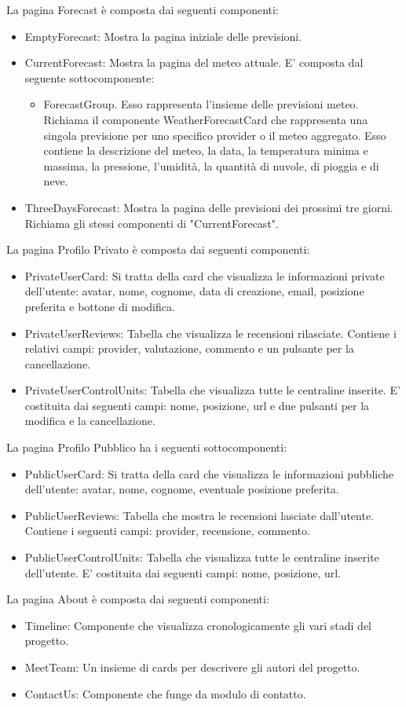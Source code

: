 La pagina Forecast è composta dai seguenti componenti:
\begin{itemize}
    \item EmptyForecast: Mostra la pagina iniziale delle previsioni.
    \item CurrentForecast: Mostra la pagina del meteo attuale. E' composta dal seguente sottocomponente: 
    \begin{itemize}
    \item ForecastGroup. Esso rappresenta l'insieme delle previsioni meteo. Richiama il componente WeatherForecastCard che rappresenta una singola previsione per uno specifico provider o il meteo aggregato. Esso contiene la descrizione del meteo, la data, la temperatura minima e massima, la pressione, l'umidità, la quantità di nuvole, di pioggia e di neve. 
    \end{itemize}
    \item ThreeDaysForecast: Mostra la pagina delle previsioni dei prossimi tre giorni. Richiama gli stessi componenti di "CurrentForecast".
\end{itemize}
La pagina Profilo Privato è composta dai seguenti componenti:
\begin{itemize}
    \item PrivateUserCard: Si tratta della card che visualizza le informazioni private dell'utente: avatar, nome, cognome, data di creazione, email, posizione preferita e bottone di modifica.
    \item PrivateUserReviews: Tabella che visualizza le recensioni rilasciate. Contiene i relativi campi: provider, valutazione, commento e un pulsante per la cancellazione.
    \item PrivateUserControlUnits: Tabella che visualizza tutte le centraline inserite. E' costituita dai seguenti campi: nome, posizione, url e due pulsanti per la modifica e la cancellazione.

\end{itemize}
La pagina Profilo Pubblico ha i seguenti sottocomponenti:
\begin{itemize}
    \item PublicUserCard: Si tratta della card che visualizza le informazioni pubbliche dell'utente: avatar, nome, cognome, eventuale posizione preferita.
    \item PublicUserReviews: Tabella che mostra le recensioni lasciate dall'utente. Contiene i seguenti campi: provider, recensione, commento.
    \item PublicUserControlUnits: Tabella che visualizza tutte le centraline inserite dell'utente. E' costituita dai seguenti campi: nome, posizione, url.

\end{itemize}   
La pagina About è composta dai seguenti componenti:
\begin{itemize}
    \item Timeline: Componente che visualizza cronologicamente gli vari stadi del progetto.
    \item MeetTeam: Un insieme di cards per descrivere gli autori del progetto. 
    \item ContactUs: Componente che funge da modulo di contatto.
\end{itemize}
